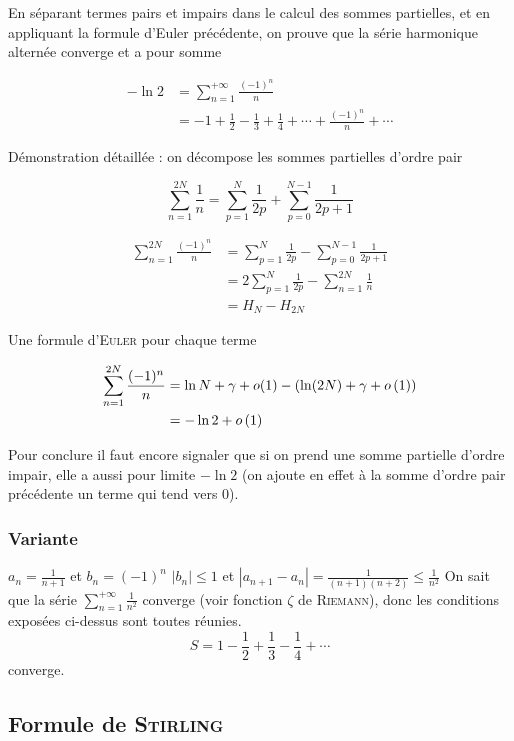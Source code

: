 En séparant termes pairs et impairs dans le calcul des sommes partielles, et en appliquant la formule d'Euler précédente, on prouve que la série harmonique alternée converge et a pour somme

\[
    \begin{aligned}
        -\ln 2 &= \sum_{n=1}^{+\infty} \frac{(-1)^n}{n}\\
        &=-1+\frac{1}{2}-\frac{1}{3}+\frac{1}{4}+\cdots+\frac{(-1)^n}{n}+\cdots 
    \end{aligned}
\]

Démonstration détaillée : on décompose les sommes partielles d'ordre pair

\[
    \sum_{n=1}^{2N} \frac1{n}=\sum_{p=1}^{N} \frac{1}{2p}+\sum_{p=0}^{N-1} \frac{1}{2p+1}
\]

\[
    \begin{aligned}
        \sum_{n=1}^{2N} \frac{(-1)^n}{n}&=\sum_{p=1}^{N} \frac{1}{2p}-\sum_{p=0}^{N-1} \frac{1}{2p+1}\\
        &=2\sum_{p=1}^{N} \frac{1}{2p}-\sum_{n=1}^{2N} \frac1{n}\\
        &=H_N-H_{2N}
    \end{aligned}
\]

Une formule d'\textsc{Euler} pour chaque terme

\[
    \begin{aligned}
        \sum_{n=1}^{2N} \frac{(-1)^n}{n}&=\ln N+\gamma+o(1)-(\ln(2N)+\gamma+o\left(1\right))\\
        &=-\ln 2+o\left(1\right)
    \end{aligned}
\]

Pour conclure il faut encore signaler que si on prend une somme partielle d'ordre impair, elle a aussi pour limite $-\ln 2$ (on ajoute en effet à la somme d'ordre pair précédente un terme qui tend vers 0).


\subsubsection{Variante}
$a_n = \frac{1}{n+1}$ et $b_n = (-1)^n$
$|b_n| \leqslant 1$ et $|a_{n+1}-a_n| = \frac{1}{(n+1)(n+2)} \leqslant \frac{1}{n^2}$
On sait que la série $\sum_{n=1}^{+\infty} \frac{1}{n^2}$ converge (voir fonction $\zeta$ de \textsc{Riemann}), donc les conditions exposées ci-dessus sont toutes réunies.
\[
    S = 1 - \frac{1}{2} + \frac{1}{3} - \frac{1}{4} + \cdots
\]
 converge.

\subsection{Formule de \textsc{Stirling}}

